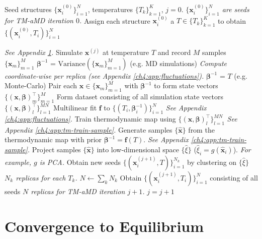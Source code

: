 \begin{algorithm}[H]
\caption{TM-aMD Protocol}
\label{ch4:alg:tm-amd-protocol}
\begin{algorithmic}[1]
\REQUIRE Seed structures $\{ \mathbf{x}_i^{(0)} \}_{i=1}^{N}$, temperatures $\{T_k\}_{k=1}^{K}$, $j=0$.
\STATE \textit{$\{ \mathbf{x}_i^{(0)} \}_{i=1}^{N}$ are seeds for TM-aMD iteration $0$.}
\STATE Assign each structure $\mathbf{x}_i^{(0)}$ a  $T \in \{T_k\}_{k=1}^{K}$ to obtain $\{ (\mathbf{x}_i^{(0)},T_i)\}_{i=1}^{N}$

\STATE \textit{See Appendix \ref{ch4:app:convergence}.}
\STATE Simulate $\mathbf{x}^{(j)}$ at temperature $T$ and record $M$ samples $\{ \mathbf{x}_m \}_{m=1}^{M}$
\STATE $\bm{\beta}^{-1}$ = $\mathrm{Variance}(\{\mathbf{x}_m\}_{m=1}^{M})$ (e.g. MD simulations)
\STATE \textit{Compute coordinate-wise per replica (see Appendix \ref{ch4:app:fluctuations}).}
\ELSE
\STATE $\bm{\beta}^{-1}$ = $T$ (e.g. Monte-Carlo)
\ENDIF
\STATE Pair each $\mathbf{x} \in \{\mathbf{x}_m\}_{m=1}^{M}$ with $\bm{\beta}^{-1}$ to form state vectors $\{(\mathbf{x},\bm{\beta})^\top_m\}_{m=1}^{M}$
\ENDFOR
\STATE Form dataset consisting of all simulation state vectors $\{(\mathbf{x},\bm{\beta})^\top_l\}_{l=1}^{MN}$
\STATE Multilinear fit $\mathbf{f}$ to $\{(T_{i},\bm{\beta}_i^{-1})\}_{i=1}^{N}$
\STATE \textit{See Appendix \ref{ch4:app:fluctuations}.}
\STATE Train thermodynamic map using $\{(\mathbf{x},\bm{\beta})^\top_l\}_{l=1}^{MN}$
\STATE \textit{See Appendix \ref{ch4:app:tm-train-sample}.}
\STATE Generate samples $\{\hat{\mathbf{x}}\}$ from the thermodynamic map with prior $\bm{\beta}^{-1} = \mathbf{f}(T)$.
\STATE \textit{See Appendix \ref{ch4:app:tm-train-sample}.}
\STATE Project samples $\{ \hat{\mathbf{x}} \}$ into low-dimensional space $\{\hat{\xi}\}$ ($\hat{\xi}_i = g(\hat{\mathbf{x}}_i)$).
\STATE \textit{For example, $g$ is PCA.}
\STATE Obtain new seeds $\{ (\mathbf{x}_i^{(j+1)},T)\}_{i=1}^{N_k}$ by clustering on $\{\hat{\xi}\}$
\STATE \textit{$N_k$ replicas for each $T_k$.}
\ENDFOR
\STATE $N \leftarrow \sum_k N_k$
\STATE Obtain $\{ (\mathbf{x}_i^{(j+1)},T_i)\}_{i=1}^{N}$ consisting of all seeds
\STATE \textit{$N$ replicas for TM-aMD iteration $j+1$.}
\STATE $j=j+1$
\ENDWHILE
\end{algorithmic}
\end{algorithm}

\section{Convergence to Equilibrium}
\label{ch4:app:convergence}

